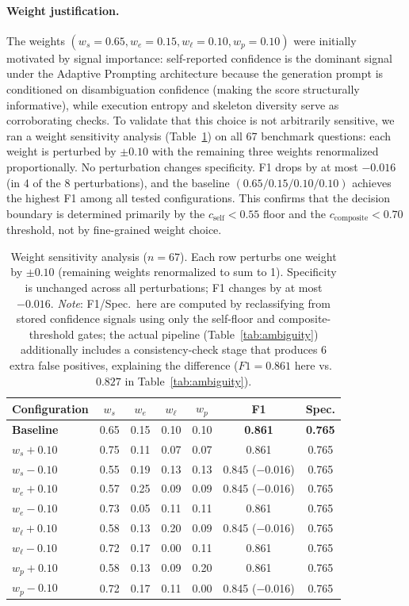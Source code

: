 \documentclass{article}
\begin{document}
\paragraph{Weight justification.}
The weights $(w_s{=}0.65, w_e{=}0.15, w_\ell{=}0.10, w_p{=}0.10)$ were
initially motivated by signal importance: self-reported confidence is the
dominant signal under the Adaptive Prompting architecture because the generation
prompt is conditioned on disambiguation confidence (making the score structurally
informative), while execution entropy and skeleton diversity serve as
corroborating checks. To validate that this choice is not
arbitrarily sensitive, we ran a weight sensitivity analysis (Table~\ref{tab:weight_sensitivity})
on all 67 benchmark questions: each weight is perturbed by $\pm 0.10$ with the
remaining three weights renormalized proportionally.
No perturbation changes specificity. F1 drops by at most $-0.016$ (in 4 of the
8 perturbations), and the baseline $(0.65/0.15/0.10/0.10)$ achieves the
highest F1 among all tested configurations.
This confirms that the decision boundary is determined primarily
by the $c_{\text{self}} < 0.55$ floor and the $c_{\text{composite}} < 0.70$
threshold, not by fine-grained weight choice.

\begin{table}[h]
\centering
\caption{Weight sensitivity analysis ($n{=}67$). Each row perturbs one weight by
  $\pm 0.10$ (remaining weights renormalized to sum to 1).
  Specificity is unchanged across all perturbations; F1 changes by at most $-0.016$.
  \emph{Note}: F1/Spec.~here are computed by reclassifying from stored
  confidence signals using only the self-floor and composite-threshold gates;
  the actual pipeline (Table~\ref{tab:ambiguity}) additionally includes
  a consistency-check stage that produces 6 extra false positives, explaining
  the difference ($F1 = 0.861$ here vs.~$0.827$ in Table~\ref{tab:ambiguity}).}
\label{tab:weight_sensitivity}
\small
\begin{tabular}{lcccccc}
\toprule
\textbf{Configuration} & $w_s$ & $w_e$ & $w_\ell$ & $w_p$ & \textbf{F1} & \textbf{Spec.} \\
\midrule
\textbf{Baseline} & 0.65 & 0.15 & 0.10 & 0.10 & \textbf{0.861} & \textbf{0.765} \\
\midrule
$w_s{+}0.10$ & 0.75 & 0.11 & 0.07 & 0.07 & 0.861 & 0.765 \\
$w_s{-}0.10$ & 0.55 & 0.19 & 0.13 & 0.13 & 0.845 {\scriptsize($-$0.016)} & 0.765 \\
$w_e{+}0.10$ & 0.57 & 0.25 & 0.09 & 0.09 & 0.845 {\scriptsize($-$0.016)} & 0.765 \\
$w_e{-}0.10$ & 0.73 & 0.05 & 0.11 & 0.11 & 0.861 & 0.765 \\
$w_\ell{+}0.10$ & 0.58 & 0.13 & 0.20 & 0.09 & 0.845 {\scriptsize($-$0.016)} & 0.765 \\
$w_\ell{-}0.10$ & 0.72 & 0.17 & 0.00 & 0.11 & 0.861 & 0.765 \\
$w_p{+}0.10$ & 0.58 & 0.13 & 0.09 & 0.20 & 0.861 & 0.765 \\
$w_p{-}0.10$ & 0.72 & 0.17 & 0.11 & 0.00 & 0.845 {\scriptsize($-$0.016)} & 0.765 \\
\bottomrule
\end{tabular}
\end{table}
\end{document}
